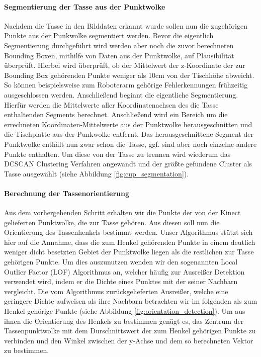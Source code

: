 \paragraph{Segmentierung der Tasse aus der Punktwolke}
Nachdem die Tasse in den Bilddaten erkannt wurde sollen nun die zugehörigen Punkte aus der Punkwolke segmentiert werden. Bevor die eigentlich Segmentierung durchgeführt wird werden aber noch die zuvor berechneten Bounding Boxen, mithilfe von Daten aus der Punktwolke, auf Plausibilität überprüft. Hierbei wird überprüft, ob der Mittelwert der z-Koordinate der zur Bounding Box gehörenden Punkte weniger als 10cm von der Tischhöhe abweicht. So können beispielsweise zum Roboterarm gehörige Fehlerkennungen frühzeitig ausgeschlossen werden. Anschließend beginnt die eigentliche Segmentierung. Hierfür werden die Mittelwerte aller Koordinatenachsen des die Tasse enthaltenden Segments berechnet. Anschließend wird ein Bereich um die errechneten Koordinaten-Mittelwerte aus der Punktwolke herausgeschnitten und die Tischplatte aus der Punkwolke entfernt. Das herausgeschnittene Segment der Punktwolke enthält nun zwar schon die Tasse, ggf. sind aber noch einzelne andere Punkte enthalten. Um diese von der Tasse zu trennen wird wiederum das DCSCAN Clustering Verfahren angewandt und der größte gefundene Cluster als Tasse ausgewählt (siehe Abbildung \ref{fig:cup_segmentation}).

\paragraph{Berechnung der Tassenorientierung}
Aus dem vorhergehenden Schritt erhalten wir die Punkte der von der Kinect gelieferten Punktwolke, die zur Tasse gehören. Aus diesen soll nun die Orientierung des Tassenhenkels bestimmt werden. Unser Algorithmus stützt sich hier auf die Annahme, dass die zum Henkel gehörenden Punkte in einem deutlich weniger dicht besetzten Gebiet der Punktwolke liegen als die restlichen zur Tasse gehörigen Punkte. Um dies auszunutzen wenden wir den sogenannten Local Outlier Factor (LOF) Algorithmus an, welcher häufig zur Ausreißer Detektion verwendet wird, indem er  die Dichte eines Punktes mit der seiner Nachbarn vergleicht. Die vom Algorithmus zurückgelieferten Ausreißer, welche eine geringere Dichte aufweisen als ihre Nachbarn betrachten wir im folgenden als zum Henkel gehörige Punkte (siehe Abbildung \ref{fig:orientation_detection}). Um aus ihnen die Orientierung des Henkels zu bestimmen genügt es, das Zentrum der Tassenpunktwolke mit dem Durschnittswert der zum Henkel gehörigen Punkte zu verbinden und den Winkel zwischen der y-Achse und dem so berechneten Vektor zu bestimmen.

